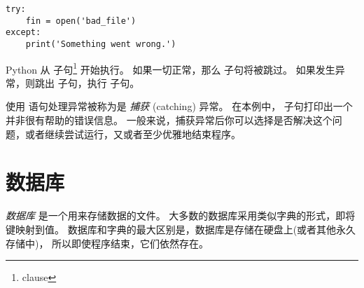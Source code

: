 {{{{{{{\begin{lstlisting}
try:
    fin = open('bad_file')
except:
    print('Something went wrong.')
\end{lstlisting}

%

Python 从  子句\footnote{clause} 开始执行。
如果一切正常，那么  子句将被跳过。
如果发生异常，则跳出  子句，执行  子句。


使用  语句处理异常被称为是 {\em 捕获} (catching) 异常。
在本例中， 子句打印出一个并非很有帮助的错误信息。
一般来说，捕获异常后你可以选择是否解决这个问题，或者继续尝试运行，又或者至少优雅地结束程序。


\section{数据库}
  


{\em 数据库} 是一个用来存储数据的文件。
大多数的数据库采用类似字典的形式，即将键映射到值。
数据库和字典的最大区别是，数据库是存储在硬盘上(或者其他永久存储中)，
所以即使程序结束，它们依然存在。

 


}}}}}}}
